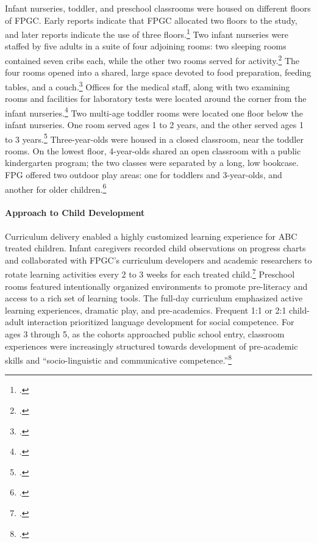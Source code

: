 \noindent Infant nurseries, toddler, and preschool classrooms were housed on different floors of FPGC. Early reports indicate that FPGC allocated two floors to the study, and later reports indicate the use of three floors.\footnote{\citet{Ramey_Smith_1977_AJMD,Ramey_Campbell_1979_SR,Ramey_1981_Modification}.} Two infant nurseries were staffed by five adults in a suite of four adjoining rooms: two sleeping rooms contained seven cribs each, while the other two rooms served for activity.\footnote{ \citet{Ramey-et-al_1977_Intro-to-ABC}.} The four rooms opened into a shared, large space devoted to food preparation, feeding tables, and a couch.\footnote{\citet{Ramey_Campbell_1979_SR}.} Offices for the medical staff, along with two examining rooms and facilities for laboratory tests were located around the corner from the infant nurseries.\footnote{\citet{abc2014-2015interviews}.} Two multi-age toddler rooms were located one floor below the infant nurseries. One room served ages 1 to 2 years, and the other served ages 1 to 3 years.\footnote{\citet{Ramey_Smith_1977_AJMD,Ramey_Campbell_1979_SR}.} Three-year-olds were housed in a closed classroom, near the toddler rooms. On the lowest floor, 4-year-olds shared an open classroom with a public kindergarten program; the two classes were separated by a long, low bookcase. FPG offered two outdoor play areas: one for toddlers and 3-year-olds, and another for older children.\footnote{\citet{Ramey_Campbell_1979_SR,Ramey_McGinness_etal_1982_Abecedarianapproach}.}\\

\paragraph{Approach to Child Development}
\noindent Curriculum delivery enabled a highly customized learning experience for ABC treated children. Infant caregivers recorded child observations on progress charts and collaborated with FPGC's curriculum developers and academic researchers to rotate learning activities every 2 to 3 weeks for each treated child.\footnote{\citet{Ramey_Collier_etal_1976_CarolinaAbecedarianProject,Campbell_Ramey_1994_CD}.} Preschool rooms featured intentionally organized environments to promote pre-literacy and access to a rich set of learning tools. The full-day curriculum emphasized active learning experiences, dramatic play, and pre-academics. Frequent 1:1 or 2:1 child-adult interaction prioritized language development for social competence. For ages 3 through 5, as the cohorts approached public school entry, classroom experiences were increasingly structured  towards development of pre-academic skills and ``socio-linguistic and communicative competence.''\footnote{\citet{Ramey-et-al_1977_Intro-to-ABC, Haskins_1985_CD, Ramey_1981_Modification, Ramey_Campbell_1979_SR, Ramey_Smith_1977_AJMD, Ramey_McGinness_etal_1982_Abecedarianapproach, Sparling_Lewis_1979_BOOKLearninggamesFirstThree,Sparling_Lewis_1984_BOOKLearningGamesThreesFours}.}\\

